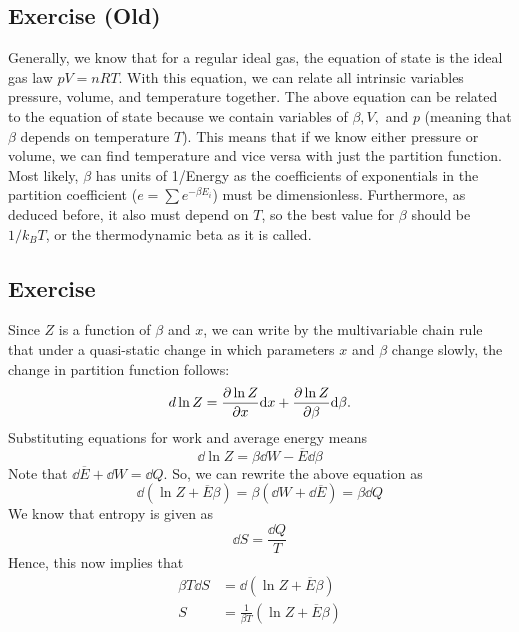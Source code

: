 \subsection{Exercise (Old)}
Generally, we know that for a regular ideal gas, the equation of state is the ideal gas law $pV = nRT$. With this equation, we can relate all intrinsic variables pressure, volume, and temperature together. The above equation can be related to the equation of state because we contain variables of $\beta, V,$ and $p$ (meaning that $\beta$ depends on temperature $T$). This means that if we know either pressure or volume, we can find temperature and vice versa with just the partition function. Most likely, $\beta$ has units of 1/Energy as the coefficients of exponentials in the partition coefficient ($e = \sum e^{-\beta E_i}$) must be dimensionless. Furthermore, as deduced before, it also must depend on $T$, so the best value for $\beta$ should be $1/k_B T$, or the thermodynamic beta as it is called. 
\subsection{Exercise}
Since $Z$ is a function of $\beta$ and $x$, we can write by the multivariable chain rule that under a quasi-static change in which parameters $x$ and $\beta$ change slowly, the change in partition function follows:
\begin{equation}d\ln Z = \pdv{\ln Z}{x}\dd x + \pdv{\ln Z}{\beta}\dd \beta.\end{equation}
Substituting equations for work and average energy means 
\begin{equation}
    \dd \ln Z = \beta \dd W - \overline E \dd \beta 
\end{equation}
Note that $\dd \overline{E} + \dd W = \dd Q$. So, we can rewrite the above equation as 
\begin{equation}
    \dd (\ln Z + \overline{E}\beta) = \beta (\dd W + \dd \overline{E}) = \beta \dd Q
\end{equation}
We know that entropy is given as 
\begin{equation}
    \dd S = \frac{\dd Q}{T}
\end{equation}
Hence, this now implies that 
\begin{align}
    \beta T \dd S &= \dd (\ln Z + \overline E \beta) \\
    S &= \frac{1}{\beta T}(\ln Z + \overline E \beta)
\end{align}
